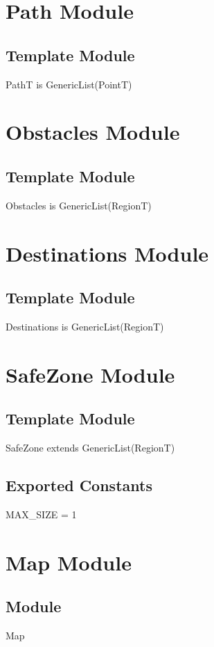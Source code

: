 \documentclass[12pt]{article}
\begin{document}
\section* {Path Module}
\subsection* {Template Module}
PathT is GenericList(PointT)
\section* {Obstacles Module}
\subsection* {Template Module}
Obstacles is GenericList(RegionT)
\section* {Destinations Module}
\subsection* {Template Module}
Destinations is GenericList(RegionT)
\section* {SafeZone Module}
\subsection* {Template Module}
SafeZone extends GenericList(RegionT)
\subsection*{Exported Constants}
MAX\_SIZE = 1
\newpage


\section* {Map Module}
\subsection* {Module}
Map
\end{document}
